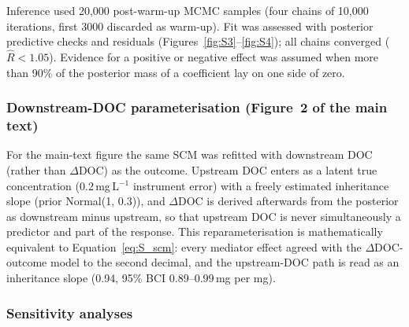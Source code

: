 \documentclass[11pt,a4paper]{article}
\begin{document}
Inference used 20,000 post-warm-up MCMC samples (four chains of 10,000 iterations, first 3000 discarded as warm-up). Fit was assessed with posterior predictive checks and residuals (Figures~\ref{fig:S3}--\ref{fig:S4}); all chains converged ($\hat{R} < 1.05$). Evidence for a positive or negative effect was assumed when more than 90\% of the posterior mass of a coefficient lay on one side of zero.

\subsubsection*{Downstream-DOC parameterisation (Figure~2 of the main text)}

For the main-text figure the same SCM was refitted with downstream DOC (rather than $\Delta$DOC) as the outcome. Upstream DOC enters as a latent true concentration (0.2\,mg\,L$^{-1}$ instrument error) with a freely estimated inheritance slope (prior Normal(1, 0.3)), and $\Delta$DOC is derived afterwards from the posterior as downstream minus upstream, so that upstream DOC is never simultaneously a predictor and part of the response. This reparameterisation is mathematically equivalent to Equation~\ref{eq:S_scm}: every mediator effect agreed with the $\Delta$DOC-outcome model to the second decimal, and the upstream-DOC path is read as an inheritance slope (0.94, 95\% BCI 0.89--0.99\,mg per mg).

\subsubsection*{Sensitivity analyses}
\end{document}
